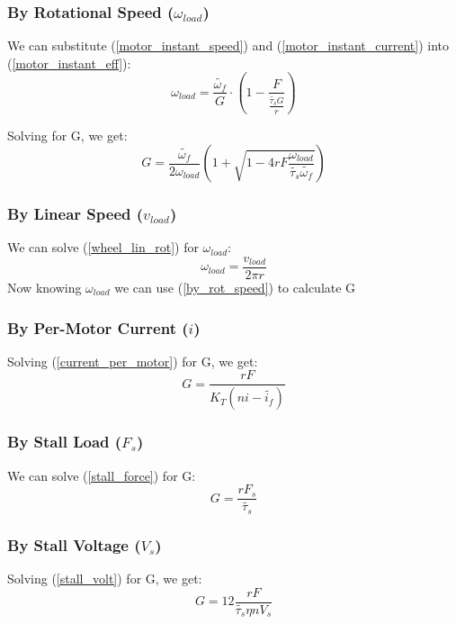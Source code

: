 \documentclass[11pt,a4paper,titlepage]{article}
\begin{document}
	
	\subsubsection{By Rotational Speed ($\omega_{load}$)}
	We can substitute (\ref{motor_instant_speed}) and (\ref{motor_instant_current}) into (\ref{motor_instant_eff}):
	\begin{equation}
	\omega_{load} = \frac{\tilde{\omega_f}}{G} \cdot (1 - \frac{F}{\frac{\tilde{\tau_s} G}{r}})
	\end{equation}
	
	Solving for G, we get:
	\begin{equation} \label{by_rot_speed}
		G = \frac{\tilde{\omega_f}}{2 \omega_{load}} \left( 1 + \sqrt{1 - 4 r F \frac{\omega_{load}}{\tilde{\tau_s} \tilde{\omega_f}}} \right)
	\end{equation}
	
	\subsubsection{By Linear Speed ($v_{load}$)}
	We can solve (\ref{wheel_lin_rot}) for $\omega_{load}$:
	\begin{equation}
		\omega_{load} = \frac{v_{load}}{2 \pi r}
	\end{equation}
	Now knowing $\omega_{load}$ we can use (\ref{by_rot_speed}) to calculate G
	
	\subsubsection{By Per-Motor Current ($i$)}
	Solving (\ref{current_per_motor}) for G, we get:
	\begin{equation}
		G = \frac{r F}{K_T (n i - \tilde{i_f})}
	\end{equation}
	
	\subsubsection{By Stall Load ($F_s$)}
	We can solve (\ref{stall_force}) for G:
	\begin{equation}
		G = \frac{r F_s}{\tilde{\tau_s}}
	\end{equation}
	
	\subsubsection{By Stall Voltage ($V_s$)}
	Solving (\ref{stall_volt}) for G, we get:
	\begin{equation}
		G = 12 \frac{r F}{\tilde{\tau_s} \eta n V_s}
	\end{equation}
	
\end{document}
